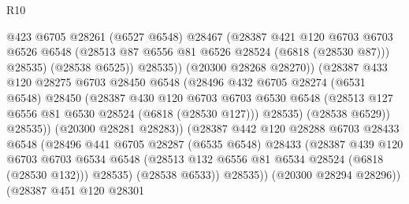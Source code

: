 \begin{lexlean}{R10}
\begin{coremodule}
                                @423
                                @6705
                                @28261
                                (@6527 @6548)
                                @28467
                                (@28387
                                  @421
                                  @120
                                  @6703
                                  @6703
                                  @6526
                                  @6548
                                  (@28513 @87 @6556 @81 @6526 @28524 (@6818 (@28530 @87)))
                                  @28535)
                                (@28538 @6525))
                              @28535))
                          (@20300 @28268 @28270))
                        (@28387
                          @433
                          @120
                          @28275
                          @6703
                          @28450
                          @6548
                          (@28496
                            @432
                            @6705
                            @28274
                            (@6531 @6548)
                            @28450
                            (@28387
                              @430
                              @120
                              @6703
                              @6703
                              @6530
                              @6548
                              (@28513 @127 @6556 @81 @6530 @28524 (@6818 (@28530 @127)))
                              @28535)
                            (@28538 @6529))
                          @28535))
                      (@20300 @28281 @28283))
                    (@28387
                      @442
                      @120
                      @28288
                      @6703
                      @28433
                      @6548
                      (@28496
                        @441
                        @6705
                        @28287
                        (@6535 @6548)
                        @28433
                        (@28387
                          @439
                          @120
                          @6703
                          @6703
                          @6534
                          @6548
                          (@28513 @132 @6556 @81 @6534 @28524 (@6818 (@28530 @132)))
                          @28535)
                        (@28538 @6533))
                      @28535))
                  (@20300 @28294 @28296))
                (@28387
                  @451
                  @120
                  @28301

\end{coremodule}
\end{lexlean}
